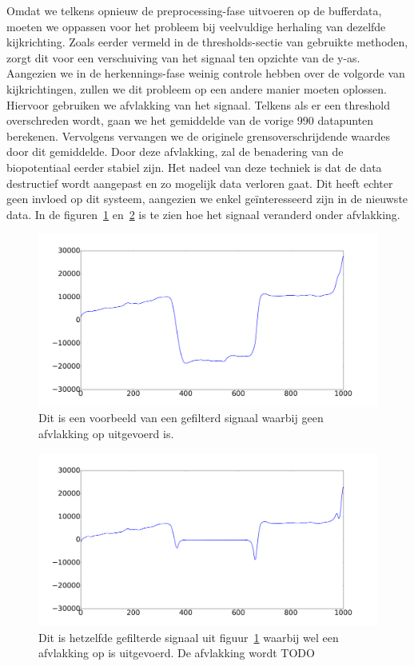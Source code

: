 \documentclass{article}
\begin{document}
Omdat we telkens opnieuw de preprocessing-fase uitvoeren op de bufferdata, moeten we oppassen voor het probleem bij veelvuldige herhaling van dezelfde kijkrichting. Zoals eerder vermeld in de thresholds-sectie van gebruikte methoden, zorgt dit voor een verschuiving van het signaal ten opzichte van de y-as. Aangezien we in de herkennings-fase weinig controle hebben over de volgorde van kijkrichtingen, zullen we dit probleem op een andere manier moeten oplossen. Hiervoor gebruiken we afvlakking van het signaal. Telkens als er een threshold overschreden wordt, gaan we het gemiddelde van de vorige 990 datapunten berekenen. Vervolgens vervangen we de originele grensoverschrijdende waardes door dit gemiddelde. Door deze afvlakking, zal de benadering van de biopotentiaal eerder stabiel zijn. Het nadeel van deze techniek is dat de data destructief wordt aangepast en zo mogelijk data verloren gaat. Dit heeft echter geen invloed op dit systeem, aangezien we enkel geïnteresseerd zijn in de nieuwste data. In de figuren~\ref{fig:afvlakking_original} en~\ref{fig:afvlakking} is te zien hoe het signaal veranderd onder afvlakking.

\begin{figure}[h]
\centering
\includegraphics[width=\linewidth]{images/afvlakking_original}
\caption{Dit is een voorbeeld van een gefilterd signaal waarbij geen afvlakking op uitgevoerd is.}
\label{fig:afvlakking_original}
\end{figure}

\begin{figure}[h]
\centering
\includegraphics[width=\linewidth]{images/afvlakking}
\caption{Dit is hetzelfde gefilterde signaal uit figuur~\ref{fig:afvlakking_original} waarbij wel een afvlakking op is uitgevoerd. De afvlakking wordt TODO}
\label{fig:afvlakking}
\end{figure}
\end{document}
